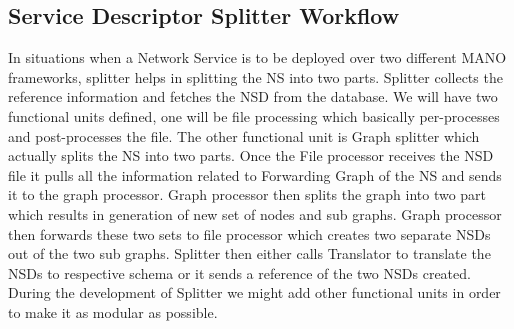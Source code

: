 \subsection{Service Descriptor Splitter Workflow}
In situations when a Network Service is to be deployed over two different MANO frameworks, splitter helps in splitting the NS into two parts. Splitter collects the reference information and fetches the NSD from the database. We will have two functional units defined, one will be file processing which basically per-processes and post-processes the file. The other functional unit is Graph splitter which actually splits the NS into two parts. Once the File processor receives the NSD file it pulls all the information related to Forwarding Graph of the NS and sends it to the graph processor. Graph processor then splits the graph into two part which results in generation of new set of nodes and sub graphs. Graph processor then forwards these two sets to file processor which creates two separate NSDs out of the two sub graphs. Splitter then either calls Translator to translate the NSDs to respective schema or it sends a reference of the two NSDs created. During the development of Splitter we might add other functional units in order to make it as modular as possible.

